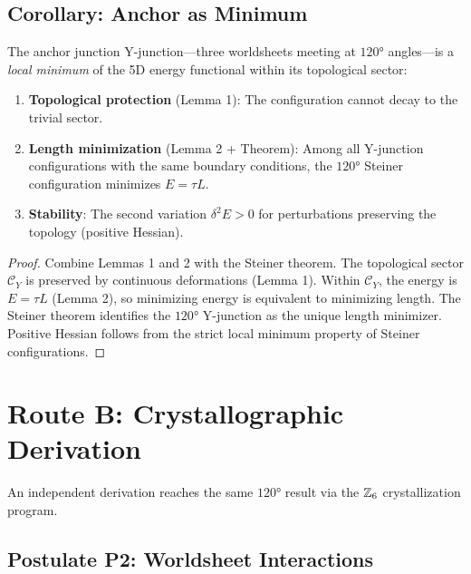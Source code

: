 \subsection{Corollary: Anchor as Minimum}

\begin{resultbox}[title=Corollary: Anchor as Topological-Geometric Minimum]
    The anchor junction Y-junction---three worldsheets meeting at $120°$ angles---is a
    \emph{local minimum} of the 5D energy functional within its topological sector:

    \begin{enumerate}
        \item \textbf{Topological protection} (Lemma 1): The configuration cannot
              decay to the trivial sector.
        \item \textbf{Length minimization} (Lemma 2 + Theorem): Among all Y-junction
              configurations with the same boundary conditions, the $120°$ Steiner
              configuration minimizes $E = \tau L$.
        \item \textbf{Stability}: The second variation $\delta^2 E > 0$ for
              perturbations preserving the topology (positive Hessian).
    \end{enumerate}
    \tagDc
\end{resultbox}

\begin{proof}
Combine Lemmas 1 and 2 with the Steiner theorem. The topological sector $\mathcal{C}_Y$
is preserved by continuous deformations (Lemma 1). Within $\mathcal{C}_Y$, the energy
is $E = \tau L$ (Lemma 2), so minimizing energy is equivalent to minimizing length.
The Steiner theorem identifies the $120°$ Y-junction as the unique length minimizer.
Positive Hessian follows from the strict local minimum property of Steiner configurations.
\end{proof}

\section{Route B: Crystallographic Derivation}
\label{sec:anchor:routeB}


An independent derivation reaches the same $120°$ result via the $\mathbb{Z}_6$
crystallization program.

\subsection{Postulate P2: Worldsheet Interactions}

